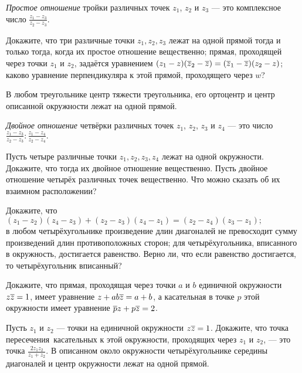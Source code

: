\documentclass[a4paper,11pt]{article}
\begin{document}
{\em Простое отношение} тройки различных точек $z_1$, $z_2$ и $z_3$ ---
это %
комплексное число
$\displaystyle\frac{z_1-z_3}{z_2-z_3}.$


 Докажите, что
  три различные точки $z_1,z_2,z_3$ лежат на одной
прямой тогда и только тогда, когда их простое отношение
вещественно;
 прямая, проходящей через точки $z_1$ и $z_2$, задаётся уравнением $(z_1-z)(\overline{z}_2-\overline{z})=(\overline{z}_1-\overline{z})(z_2-z)$;
 каково уравнение перпендикуляра к этой прямой, проходящего через $w$?

 В любом треугольнике центр тяжести треугольника,
его ортоцентр  и центр описанной окружности лежат на одной прямой.




{\em Двойное отношение} четвёрки различных точек $z_1$, $z_2$, $z_3$ и $z_4$ ---
это %
число
$\displaystyle\frac{z_1-z_3}{z_2-z_3}:\frac{z_1-z_4}{z_2-z_4}.$

 Пусть четыре различные точки $z_1,z_2,z_3,z_4$ лежат на одной
окружности. Докажите, что тогда их двойное отношение
вещественно.
 Пусть двойное отношение четырёх различных точек вещественно. Что
можно сказать об их взаимном расположении?

Докажите, что 
$(z_1-z_2)(z_4-z_3)+(z_2-z_3)(z_4-z_1)=(z_2-z_4)(z_3-z_1);$\\
   в любом четырёхугольнике произведение
 длин диагоналей не превосходит сумму произведений длин
противоположных сторон;
  для четырёхугольника, вписанного в окружность, достигается равенство.
 Верно ли, что если равенство достигается, то четырёхугольник вписанный?

Докажите, что прямая, проходящая через точки $a$ и $b$ единичной окружности $z\overline{z}=1$, имеет уравнение $z+ab\overline{z}=a+b$, а касательная в точке $p$ этой окружности имеет уравнение $\overline{p} z+ p\overline{z}=2$.

 Пусть $z_1$ и $z_2$ --- точки на единичной окружности
$z\overline{z}=1$. Докажите, что точка пересечения~касательных
к этой окружности, проходящих через $z_1$ и $z_2$, --- это точка $\frac{2z_1z_2}{z_1+z_2}$.
 В описанном около окружности
четырёхугольнике середины диагоналей и центр окружности
лежат на одной прямой.
\end{document}
